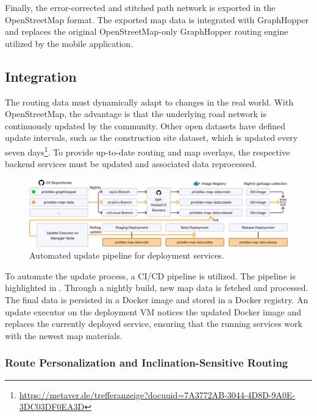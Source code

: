 Finally, the error-corrected and stitched path network is exported in the OpenStreetMap format. The exported map data is integrated with GraphHopper and replaces the original OpenStreetMap-only GraphHopper routing engine utilized by the mobile application.

\subsection{Integration}

The routing data must dynamically adapt to changes in the real world. With OpenStreetMap, the advantage is that the underlying road network is continuously updated by the community. Other open datasets have defined update intervals, such as the construction site dataset, which is updated every seven days\footnote{\url{https://metaver.de/trefferanzeige?docuuid=7A3772AB-3044-4D8D-9A0E-3DC03DF0EA3D}}. To provide up-to-date routing and map overlays, the respective backend services must be updated and associated data reprocessed. 

\begin{figure}[htbp]
\centering
\includegraphics[width=\linewidth]{images/multi-stage-continuous-deployment.png}
\caption{Automated update pipeline for deployment services.}
\label{fig:multi-stage-continuous-deployment}
\end{figure}

To automate the update process, a CI/CD pipeline is utilized. The pipeline is highlighted in . Through a nightly build, new map data is fetched and processed. The final data is persisted in a Docker image and stored in a Docker registry. An update executor on the deployment VM notices the updated Docker image and replaces the currently deployed service, ensuring that the running services work with the newest map materials.

\subsubsection{Route Personalization and Inclination-Sensitive Routing}

